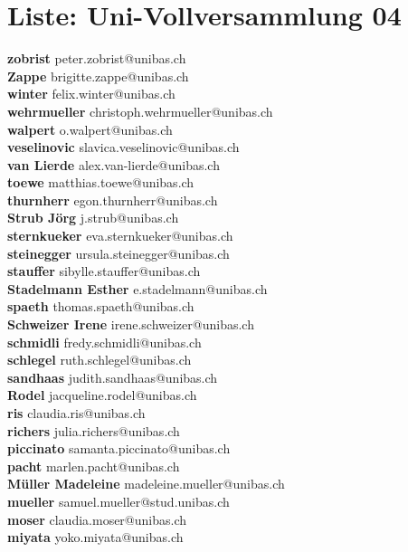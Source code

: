 \documentclass{scrartcl}
\begin{document}
\section*{Liste: Uni-Vollversammlung 04}
\textbf{zobrist } peter.zobrist@unibas.ch\\
\textbf{Zappe } brigitte.zappe@unibas.ch\\
\textbf{winter } felix.winter@unibas.ch\\
\textbf{wehrmueller } christoph.wehrmueller@unibas.ch\\
\textbf{walpert } o.walpert@unibas.ch\\
\textbf{veselinovic } slavica.veselinovic@unibas.ch\\
\textbf{van Lierde } alex.van-lierde@unibas.ch\\
\textbf{toewe } matthias.toewe@unibas.ch\\
\textbf{thurnherr } egon.thurnherr@unibas.ch\\
\textbf{Strub Jörg } j.strub@unibas.ch\\
\textbf{sternkueker } eva.sternkueker@unibas.ch\\
\textbf{steinegger } ursula.steinegger@unibas.ch\\
\textbf{stauffer } sibylle.stauffer@unibas.ch\\
\textbf{Stadelmann Esther } e.stadelmann@unibas.ch\\
\textbf{spaeth } thomas.spaeth@unibas.ch\\
\textbf{Schweizer Irene } irene.schweizer@unibas.ch\\
\textbf{schmidli } fredy.schmidli@unibas.ch\\
\textbf{schlegel } ruth.schlegel@unibas.ch\\
\textbf{sandhaas } judith.sandhaas@unibas.ch\\
\textbf{Rodel } jacqueline.rodel@unibas.ch\\
\textbf{ris } claudia.ris@unibas.ch\\
\textbf{richers } julia.richers@unibas.ch\\
\textbf{piccinato } samanta.piccinato@unibas.ch\\
\textbf{pacht } marlen.pacht@unibas.ch\\
\textbf{Müller Madeleine } madeleine.mueller@unibas.ch\\
\textbf{mueller } samuel.mueller@stud.unibas.ch\\
\textbf{moser } claudia.moser@unibas.ch\\
\textbf{miyata } yoko.miyata@unibas.ch\\
\end{document}
